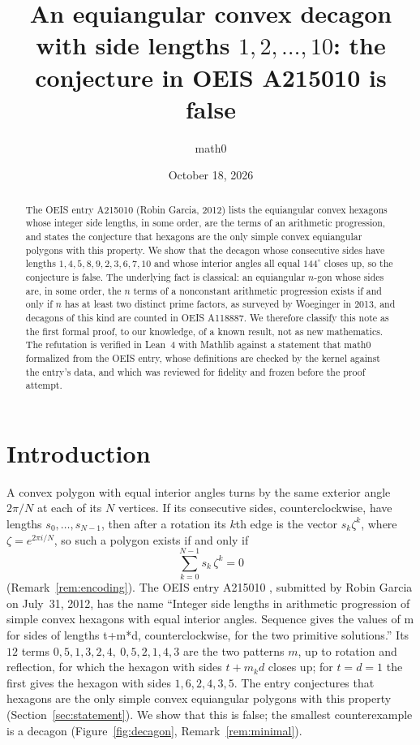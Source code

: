 \documentclass[11pt]{amsart}
\title[An equiangular decagon with sides $1,\dots,10$ (OEIS A215010)]{An equiangular convex decagon with side lengths $1,2,\dots,10$: the conjecture in OEIS A215010 is false}
\author{math0}
\date{October 18, 2026}
\theoremstyle{plain}
\theoremstyle{definition}
\begin{document}
\begin{abstract}
The OEIS entry A215010 (Robin Garcia, 2012) lists the equiangular convex hexagons whose integer side lengths, in some order, are the terms of an arithmetic progression, and states the conjecture that hexagons are the only simple convex equiangular polygons with this property.
We show that the decagon whose consecutive sides have lengths $1,4,5,8,9,2,3,6,7,10$ and whose interior angles all equal $144^\circ$ closes up, so the conjecture is false.
The underlying fact is classical: an equiangular $n$-gon whose sides are, in some order, the $n$ terms of a nonconstant arithmetic progression exists if and only if $n$ has at least two distinct prime factors, as surveyed by Woeginger in 2013, and decagons of this kind are counted in OEIS A118887.
We therefore classify this note as the first formal proof, to our knowledge, of a known result, not as new mathematics.
The refutation is verified in Lean~4 with Mathlib against a statement that math0 formalized from the OEIS entry, whose definitions are checked by the kernel against the entry's data, and which was reviewed for fidelity and frozen before the proof attempt.
\end{abstract}
\maketitle

\section{Introduction}

A convex polygon with equal interior angles turns by the same exterior angle $2\pi/N$ at each of its $N$ vertices.
If its consecutive sides, counterclockwise, have lengths $s_0,\dots,s_{N-1}$, then after a rotation its $k$th edge is the vector $s_k\zeta^k$, where $\zeta=e^{2\pi i/N}$, so such a polygon exists if and only if
\begin{equation}\label{eq:close}
  \sum_{k=0}^{N-1} s_k\,\zeta^k = 0
\end{equation}
(Remark~\ref{rem:encoding}).
The OEIS entry A215010 \cite{A215010}, submitted by Robin Garcia on July~31, 2012, has the name ``Integer side lengths in arithmetic progression of simple convex hexagons with equal interior angles. Sequence gives the values of m for sides of lengths t+m*d, counterclockwise, for the two primitive solutions.''
Its $12$ terms $0,5,1,3,2,4,\ 0,5,2,1,4,3$ are the two patterns $m$, up to rotation and reflection, for which the hexagon with sides $t+m_kd$ closes up; for $t=d=1$ the first gives the hexagon with sides $1,6,2,4,3,5$.
The entry conjectures that hexagons are the only simple convex equiangular polygons with this property (Section~\ref{sec:statement}).
We show that this is false; the smallest counterexample is a decagon (Figure~\ref{fig:decagon}, Remark~\ref{rem:minimal}).
\end{document}

